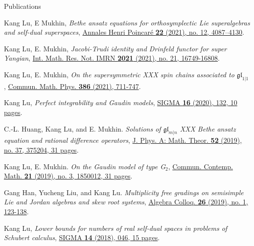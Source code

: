 \documentclass{resume} %
\begin{document}
\begin{rSection}{Publications}
\begin{etaremune}[leftmargin=0cm]

\item Kang Lu, E Mukhin, {\it Bethe ansatz equations for orthosymplectic Lie superalgebras and self-dual superspaces}, \href{https://doi.org/10.1007/s00023-021-01091-8}{Annales Henri Poincar\'{e} \textbf{22} (2021), no. 12, 4087--4130}.

\item Kang Lu, E. Mukhin, {\it Jacobi-Trudi identity and Drinfeld functor for super Yangian}, \href{https://dx.doi.org/10.1093/imrn/rnab023}{Int. Math. Res. Not. IMRN \textbf{2021} (2021), no. 21, 16749-16808}.

\item Kang Lu, E. Mukhin, {\it On the supersymmetric XXX spin chains associated to $\mathfrak{gl}_{1|1}$}, \href{https://dx.doi.org/10.1007/s00220-021-04155-2}{Commun. Math. Phys. \textbf{386} (2021), 711-747}.

\item Kang Lu, {\it Perfect integrability and Gaudin models}, \href{https://doi.org/10.3842/SIGMA.2020.132}{SIGMA {\bf 16} (2020), 132, 10 pages}.

\item C.-L. Huang, Kang Lu, and E. Mukhin.
{\it Solutions of $\mathfrak{gl}_{m|n}$ XXX Bethe ansatz equation and rational difference operators}, \href{https://doi.org/10.1088/1751-8121/ab1960}{J. Phys. A: Math. Theor. \textbf{52} (2019), no. 37, 375204, 31 pages}.	
			
\item Kang Lu, E. Mukhin. 
{\it On the Gaudin model of type G$_2$}, \href{https://doi.org/10.1142/S0219199718500128}{Commun. Contemp. Math. \textbf{21} (2019), no. 3, 1850012, 31 pages}.

\item Gang Han, Yucheng Liu, and Kang Lu. {\it Multiplicity free gradings on semisimple Lie and Jordan algebras and skew root systems}, \href{https://doi.org/10.1142/S1005386719000129}{Algebra Colloq. {\bf 26} (2019), no. 1, 123-138}.
			
\item Kang Lu, {\it Lower bounds for numbers of real self-dual spaces in problems of Schubert calculus}, \href{https://doi.org/10.3842/SIGMA.2018.046}{SIGMA {\bf 14} (2018), 046, 15 pages}.	
			

\end{etaremune}
\end{rSection}
\end{document}
